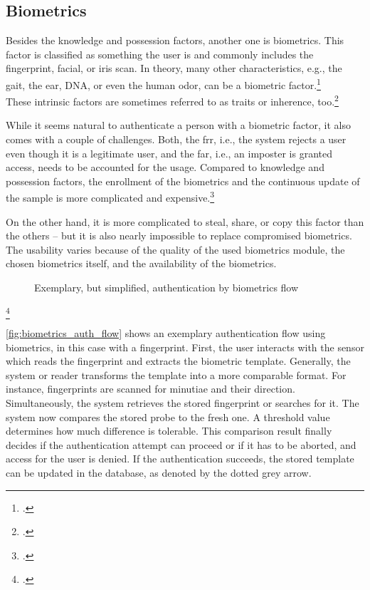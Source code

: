 \subsection{Biometrics}

Besides the knowledge and possession factors, another one is biometrics. This factor is classified as \frqq something the user is\flqq{} and commonly includes the fingerprint, facial, or iris scan. In theory, many other characteristics, e.g., the gait, the ear, DNA, or even the human odor, can be a biometric factor.\footcite[See][30--34]{Jain2011}\\
These intrinsic factors are sometimes referred to as traits or inherence, too.\footcite[See][186]{dasgupta2017multi}

While it seems natural to authenticate a person with a biometric factor, it also comes with a couple of challenges. Both, the \gls{frr}, i.e., the system rejects a user even though it is a legitimate user, and the \gls{far}, i.e., an imposter is granted access, needs to be accounted for the usage. Compared to knowledge and possession factors, the enrollment of the biometrics and the continuous update of the sample is more complicated and expensive.\footcites[See][18--24]{Jain2011}[See][34--37]{265831}

On the other hand, it is more complicated to steal, share, or copy this factor than the others -- but it is also nearly impossible to replace compromised biometrics. The usability varies because of the quality of the used biometrics module, the chosen biometrics itself, and the availability of the biometrics.

\begin{figure}[hbt]
	\centering
	
	\caption[Exemplary, but simplified, authentication by biometrics flow]{Exemplary, but simplified, authentication by biometrics flow\footnotemark}
	\label{fig:biometrics_auth_flow}
\end{figure}
\footcitetext[Source: diagram by author, based on][11]{Jain2011}

\autoref{fig:biometrics_auth_flow} shows an exemplary authentication flow using biometrics, in this case with a fingerprint. First, the user interacts with the sensor which reads the fingerprint and extracts the biometric template. Generally, the system or reader transforms the template into a more comparable format. For instance, fingerprints are scanned for minutiae and their direction. Simultaneously, the system retrieves the stored fingerprint or searches for it. The system now compares the stored probe to the fresh one. A threshold value determines how much difference is tolerable. This comparison result finally decides if the authentication attempt can proceed or if it has to be aborted, and access for the user is denied. If the authentication succeeds, the stored template can be updated in the database, as denoted by the dotted grey arrow.

